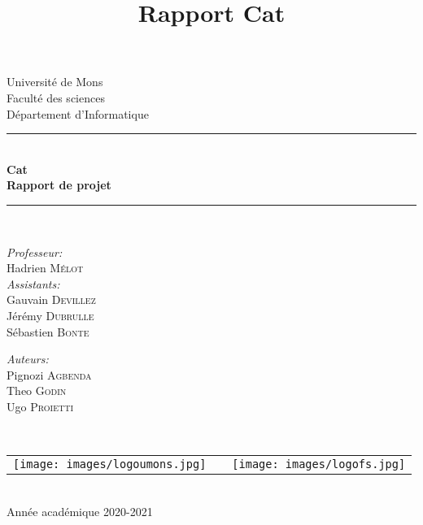 \documentclass{article}
\title{Rapport Cat}
\author{ }
\date{ }
\begin{document}
\begin{titlepage}
    \begin{center}
        
        {\Large Université de Mons}\\[1ex]
        {\Large Faculté des sciences}\\[1ex]
        {\Large Département d'Informatique}\\[2.5cm]
        
        \newcommand{\HRule}{\rule{\linewidth}{0.3mm}}
        \HRule \\[0.3cm]
        { \LARGE \bfseries Cat \\[0.3cm]}
        { \LARGE \bfseries Rapport de projet \\[0.1cm]} %
        \HRule \\[1.5cm]
        
        \begin{minipage}[t]{0.45\textwidth}
            \begin{flushleft} \large
                \emph{Professeur:}\\
                Hadrien \textsc{Mélot}\\
                \emph{Assistants:}\\
                Gauvain \textsc{Devillez}\\
                Jérémy \textsc{Dubrulle}\\
                Sébastien \textsc{Bonte}\\
            \end{flushleft}
        \end{minipage}
        \begin{minipage}[t]{0.45\textwidth}
            \begin{flushright} \large
                \emph{Auteurs:} \\
                Pignozi \textsc{Agbenda} \\
                Theo \textsc{Godin} \\
                Ugo \textsc{Proietti}
            \end{flushright}
        \end{minipage}\\[2ex]
        
        \vfill
        
        \begin{center}
            \begin{tabular}[t]{c c c}
                \texttt{[image: images/logoumons.jpg]} &
                \hspace{0.3cm} &
                \texttt{[image: images/logofs.jpg]}
            \end{tabular}
        \end{center}~\\
        
        {\large Année académique 2020-2021}
        
    \end{center}
\end{titlepage}
\end{document}
